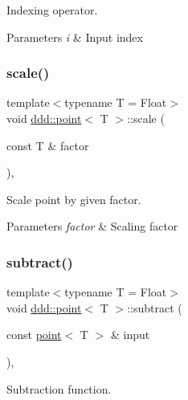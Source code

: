 Indexing operator. 


\begin{DoxyParams}{Parameters}
{\em i} & Input index \\
\hline
\end{DoxyParams}
\mbox{\label{classddd_1_1point_a5edb11d18e78ff66bc7aa2a5f26b8aa4}} 
\subsubsection{\texorpdfstring{scale()}{scale()}}
{\footnotesize\ttfamily template$<$typename T = Float$>$ \\
void \hyperlink{classddd_1_1point}{ddd\+::point}$<$ T $>$\+::scale (\begin{DoxyParamCaption}\item[{const T \&}]{factor }\end{DoxyParamCaption})\hspace{0.3cm}{\ttfamily [inline]}, {\ttfamily [inherited]}}



Scale point by given factor. 


\begin{DoxyParams}{Parameters}
{\em factor} & Scaling factor \\
\hline
\end{DoxyParams}
\mbox{\label{classddd_1_1point_abf2e2ea5474534eb17d1cb6bd96b7913}} 
\subsubsection{\texorpdfstring{subtract()}{subtract()}}
{\footnotesize\ttfamily template$<$typename T = Float$>$ \\
void \hyperlink{classddd_1_1point}{ddd\+::point}$<$ T $>$\+::subtract (\begin{DoxyParamCaption}\item[{const \hyperlink{classddd_1_1point}{point}$<$ T $>$ \&}]{input }\end{DoxyParamCaption})\hspace{0.3cm}{\ttfamily [inline]}, {\ttfamily [inherited]}}



Subtraction function. 



